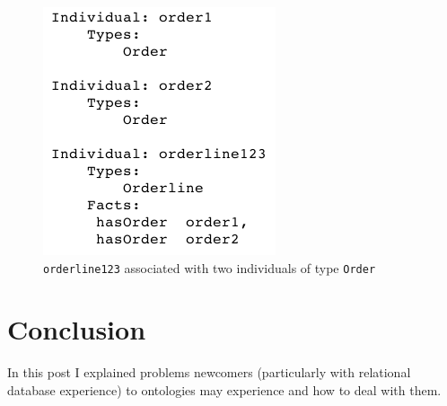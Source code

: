 \documentclass{amsart}
\begin{document}
     \begin{figure}
      \centering \includegraphics[trim = 0mm 0mm 0mm 0mm, clip, scale=0.5]{./HasTwoOrders.png}
      \vspace{-3mm}
      \caption{\texttt{orderline123} associated with two individuals of type \texttt{Order}}\label{f_HasTwoOrders}
    \end{figure}
    
  \section{Conclusion}
  In this post I explained problems newcomers (particularly with relational database experience) to ontologies may experience and how to deal with them.
  
  
  
  
 
\end{document}
